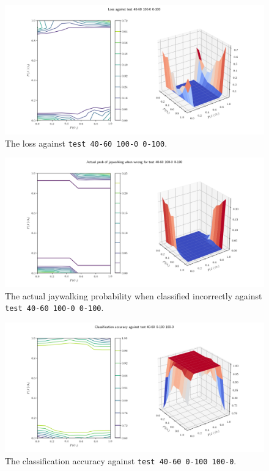 \documentclass[]{report}
\newcommand{\code}{\texttt}
\begin{document}
\begin{figure}[h]
    \centering
    \centerline{\includegraphics[scale=0.55]{test_40-60_100-0_0-100_loss.png}}
    \caption[]{The loss against \code{test 40-60 100-0 0-100}.}
    \label{fig:test_40-60_100-0_0-100_loss_plot}
\end{figure}

\begin{figure}[h]
    \centering
    \centerline{\includegraphics[scale=0.55]{test_40-60_100-0_0-100_jay_prob.png}}
    \caption[]{The actual jaywalking probability when classified incorrectly against \code{test 40-60 100-0 0-100}.}
    \label{fig:test_40-60_100-0_0-100_jay_prob_plot}
\end{figure}

% 
% 

\begin{figure}[h]
    \centering
    \centerline{\includegraphics[scale=0.55]{test_40-60_0-100_100-0_accuracy.png}}
    \caption[]{The classification accuracy against \code{test 40-60 0-100 100-0}.}
    \label{fig:test_40-60_0-100_100-0_accuracy_plot}
\end{figure}
\end{document}
